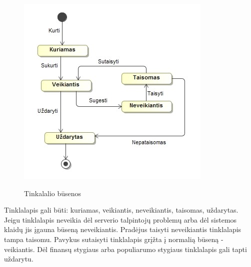 \documentclass{VUMIFPSkursinis}
\begin{document}
\begin{figure}[H]
    \centering
    \includegraphics[scale=0.8]{img/geri/Tinkalalio_Busenos.jpg}
    \label{img:uml20}
	\caption{Tinkalalio būsenos}
\end{figure}
Tinklalapis gali būti: kuriamas, veikiantis, neveikiantis, taisomas, uždarytas. Jeigu tinklalapis neveikia dėl serverio talpintojų problemų arba dėl sistemos klaidų jis įgauna būseną neveikiantis. Pradėjus taisyti neveikiantis tinklalapis tampa taisomu. Pavykus sutaisyti tinklalapis grįžta į normalią būseną - veikiantis. Dėl finansų stygiaus arba populiarumo stygiaus tinklalapis gali tapti uždarytu.
\end{document}

